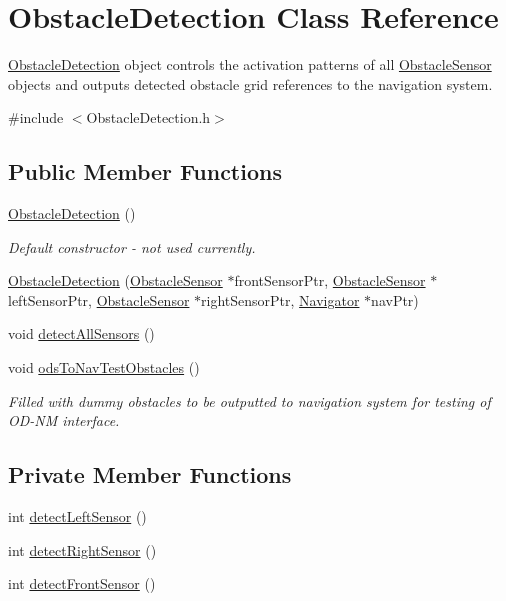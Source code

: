 \hypertarget{class_obstacle_detection}{}\section{Obstacle\+Detection Class Reference}
\label{class_obstacle_detection}


\mbox{\hyperlink{class_obstacle_detection}{Obstacle\+Detection}} object controls the activation patterns of all \mbox{\hyperlink{class_obstacle_sensor}{Obstacle\+Sensor}} objects and outputs detected obstacle grid references to the navigation system.  




{\ttfamily \#include $<$Obstacle\+Detection.\+h$>$}

\subsection*{Public Member Functions}
\begin{DoxyCompactItemize}
\item 
\mbox{\hyperlink{class_obstacle_detection_a1ef460cae951b0ddaa04088645109f47}{Obstacle\+Detection}} ()
\begin{DoxyCompactList}\small\item\em Default constructor -\/ not used currently. \end{DoxyCompactList}\item 
\mbox{\hyperlink{class_obstacle_detection_ab70842be18c993b94612f17b653f3674}{Obstacle\+Detection}} (\mbox{\hyperlink{class_obstacle_sensor}{Obstacle\+Sensor}} $\ast$front\+Sensor\+Ptr, \mbox{\hyperlink{class_obstacle_sensor}{Obstacle\+Sensor}} $\ast$left\+Sensor\+Ptr, \mbox{\hyperlink{class_obstacle_sensor}{Obstacle\+Sensor}} $\ast$right\+Sensor\+Ptr, \mbox{\hyperlink{class_navigator}{Navigator}} $\ast$nav\+Ptr)
\item 
void \mbox{\hyperlink{class_obstacle_detection_afe8d20425157946ba8e562d9696fef86}{detect\+All\+Sensors}} ()
\item 
void \mbox{\hyperlink{class_obstacle_detection_a4977cf4929ce5b8ec1b42353df9bd2b7}{ods\+To\+Nav\+Test\+Obstacles}} ()
\begin{DoxyCompactList}\small\item\em Filled with dummy obstacles to be outputted to navigation system for testing of O\+D-\/\+NM interface. \end{DoxyCompactList}\end{DoxyCompactItemize}
\subsection*{Private Member Functions}
\begin{DoxyCompactItemize}
\item 
int \mbox{\hyperlink{class_obstacle_detection_ab79f1c269cb0c4e033a3485309f870e4}{detect\+Left\+Sensor}} ()
\item 
int \mbox{\hyperlink{class_obstacle_detection_ab9d63d29923dfd52061f456afc403e45}{detect\+Right\+Sensor}} ()
\item 
int \mbox{\hyperlink{class_obstacle_detection_a617610d3df5438e409bb810a53e61772}{detect\+Front\+Sensor}} ()
\end{DoxyCompactItemize}
